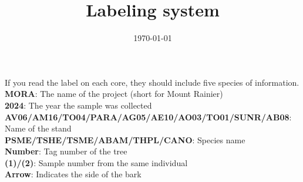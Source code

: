 \documentclass[11pt,letter]{article}
\begin{document}
\title{Labeling system} 
\date{\today}
\maketitle

\setlength{\parindent}{0pt}
\setlength{\parskip}{3pt}

If you read the label on each core, they should include five species of information.\\

\textbf{MORA}: The name of the project (short for Mount Rainier)\\
\textbf{2024}: The year the sample was collected\\
\textbf{AV06/AM16/TO04/PARA/AG05/AE10/AO03/TO01/SUNR/AB08}: Name of the stand\\
\textbf{PSME/TSHE/TSME/ABAM/THPL/CANO}: Species name\\
\textbf{Number}: Tag number of the tree\\
\textbf{(1)/(2)}: Sample number from the same individual\\
\textbf{Arrow}: Indicates the side of the bark
\end{document}
